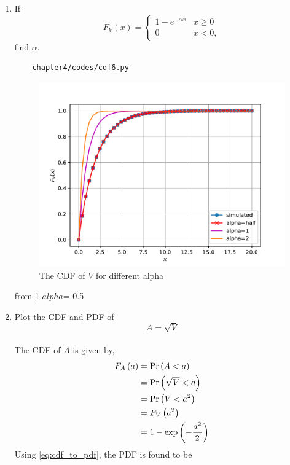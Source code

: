 \begin{enumerate}
%
%
\item
If
%
\begin{equation}
F_{V}(x) = 
\begin{cases}
1 - e^{-\alpha x} & x \geq 0 \\
0 & x < 0,
\end{cases}
\label{eq:chisq2_cdf_gen}
\end{equation}
%
find $\alpha$.\\
\solution 
%
\begin{lstlisting}
	chapter4/codes/cdf6.py
\end{lstlisting}
\begin{figure}
\centering
\includegraphics[scale=0.8]{chapter4/figs/cdf6.pdf}
\caption{The CDF of $V$ for different alpha}
\label{fig:gauss_cdf_alpha}
\end{figure}
from \ref{fig:gauss_cdf_alpha}
$alpha$= 0.5
\item
\label{ch3_raleigh_sim}
Plot the CDF and PDF of
%
\begin{equation}
A = \sqrt{V}
\end{equation}\\
\solution 
The CDF of $A$ is given by,
\begin{align}
	F_{A}\left(a\right) &= \Pr\left(A < a\right)\\
	&= \Pr\left(\sqrt{V} < a\right)\\
	&= \Pr\left(V < a^2\right)\\
	&= F_{V}\left(a^2\right)\\
	&= 1-\exp\left(-\frac{a^2}{2}\right) 
\end{align}
Using \eqref{eq:cdf_to_pdf}, the PDF is found to be
\begin{align}

\end{align}
\end{enumerate}

